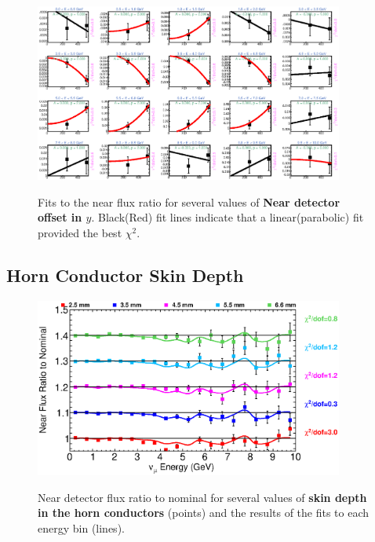 \begin{figure}[hb]
  \begin{center}
    {\includegraphics[width=4.0in]{figures/LBNENDY_near_fits.eps}}
  \end{center}
\caption{ Fits to the near flux ratio for several values of {\bf Near detector offset in $y$}. Black(Red) fit lines indicate that a linear(parabolic) fit provided the best $\chi^2$. }
\end{figure}


\clearpage
\subsection{Horn Conductor Skin Depth}

\begin{figure}[ht]
  \begin{center}
    {\includegraphics[width=4.0in]{figures/SkinDepthIC__near_summary.eps}}
  \end{center}
\caption{ Near detector flux ratio to nominal for several values of {\bf skin depth in the horn conductors} (points) and the results of the fits to each energy bin (lines).}
\end{figure}

